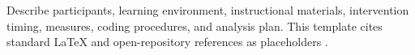 \begin{sectionaccent}
Describe participants, learning environment, instructional materials, intervention timing, measures, coding procedures, and analysis plan. This template cites standard LaTeX and open-repository references as placeholders \cite{lamport1994latex,zenodo}.

\end{sectionaccent}
